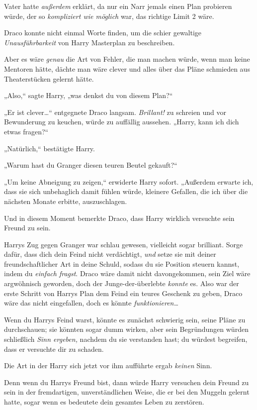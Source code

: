 {Vater hatte \emph{außerdem} erklärt, da nur ein Narr jemals einen Plan probieren würde, der so \emph{kompliziert wie möglich} war, das richtige Limit 2 wäre.

Draco konnte nicht einmal Worte finden, um die schier gewaltige \emph{Unausführbarkeit} von Harry Masterplan zu beschreiben.

Aber es wäre \emph{genau} die Art von Fehler, die man machen würde, wenn man keine Mentoren hätte, dächte man wäre clever und alles über das Pläne schmieden aus Theaterstücken gelernt hätte.

„Also,“ sagte Harry, „was denkst du von diesem Plan?“

„Er ist clever…“ entgegnete Draco langsam. \emph{Brillant!} zu schreien und vor Bewunderung zu keuchen, würde zu auffällig aussehen. „Harry, kann ich dich etwas fragen?“

„Natürlich,“ bestätigte Harry.

„Warum hast du Granger diesen teuren Beutel gekauft?“

„Um keine Abneigung zu zeigen,“ erwiderte Harry sofort. „Außerdem erwarte ich, dass sie sich unbehaglich damit fühlen würde, kleinere Gefallen, die ich über die nächsten Monate erbitte, auszuschlagen.

Und in diesem Moment bemerkte Draco, dass Harry wirklich versuchte sein Freund zu sein.

Harrys Zug gegen Granger war schlau gewesen, vielleicht sogar brilliant. Sorge dafür, dass dich dein Feind nicht verdächtigt, \emph{und} setze sie mit deiner freundschaftlicher Art in deine Schuld, sodass du sie Position steuern kannst, indem du \emph{einfach fragst}. Draco wäre damit nicht davongekommen, sein Ziel wäre argwöhnisch geworden, doch der Junge-der-überlebte \emph{konnte} es. Also war der erste Schritt von Harrys Plan dem Feind ein teures Geschenk zu geben, Draco wäre das nicht eingefallen, doch es könnte \emph{funktionieren…}

Wenn du Harrys Feind warst, könnte es zunächst schwierig sein, seine Pläne zu durchschauen; sie könnten sogar dumm wirken, aber sein Begründungen würden schließlich \emph{Sinn ergeben,} nachdem du sie verstanden hast; du würdest begreifen, dass er versuchte dir zu schaden.

Die Art in der Harry sich jetzt vor ihm aufführte ergab \emph{keinen} Sinn.

Denn wenn du Harrys Freund bist, dann würde Harry versuchen dein Freund zu sein in der fremdartigen, unverständlichen Weise, die er bei den Muggeln gelernt hatte, sogar wenn es bedeutete dein gesamtes Leben zu zerstören.

}
